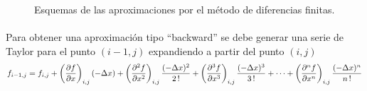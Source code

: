 \documentclass[letterpaper, openright, 12pt]{book}
\begin{document}
    \begin{figure}[htbp!]
        \centering
        \caption[Aproximaciones por Diferencias Finitas]{Esquemas de las aproximaciones por el método de diferencias finitas.\cite{chapra}}
    \end{figure}

\paragraph*{}
    Para obtener una aproximación tipo ``backward'' se debe generar una serie de Taylor para el punto $(i-1, j)$ expandiendo a partir del punto $(i, j)$
    \begin{equation}
    f_{i-1, j} = f_{i,j} + \left(\pdv{f}{x}\right)_{i,j} (-\Delta x)
    + \left(\pdv[2]{f}{x} \right)_{i,j} \frac{(-\Delta x)^2 }{2\,!}
    + \left( \pdv[3]{f}{x} \right)_{i,j} \frac{(-\Delta x)^3}{3\,!}
    + \dotsb + \left(\pdv[n]{f}{x} \right)_{i,j} \frac{(-\Delta x)^n}{n\,!}
    \label{taylor-backward}
    \end{equation}
\end{document}
